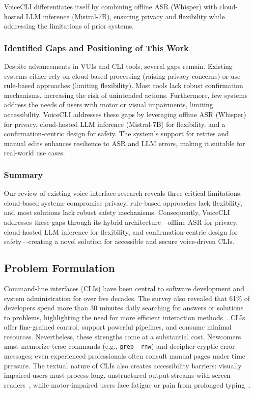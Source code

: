 \documentclass[a4paper,12pt]{article}
\begin{document}
VoiceCLI differentiates itself by combining offline ASR (Whisper) with cloud-hosted LLM inference (Mistral-7B), ensuring privacy and flexibility while addressing the limitations of prior systems.

\subsubsection{Identified Gaps and Positioning of This Work}
Despite advancements in VUIs and CLI tools, several gaps remain. Existing systems either rely on cloud-based processing (raising privacy concerns) or use rule-based approaches (limiting flexibility). Most tools lack robust confirmation mechanisms, increasing the risk of unintended actions. Furthermore, few systems address the needs of users with motor or visual impairments, limiting accessibility. VoiceCLI addresses these gaps by leveraging offline ASR (Whisper) for privacy, cloud-hosted LLM inference (Mistral-7B) for flexibility, and a confirmation-centric design for safety. The system's support for retries and manual edits enhances resilience to ASR and LLM errors, making it suitable for real-world use cases.

\subsubsection{Summary}
Our review of existing voice interface research reveals three critical limitations: cloud-based systems compromise privacy, rule-based approaches lack flexibility, and most solutions lack robust safety mechanisms. Consequently, VoiceCLI addresses these gaps through its hybrid architecture—offline ASR for privacy, cloud-hosted LLM inference for flexibility, and confirmation-centric design for safety—creating a novel solution for accessible and secure voice-driven CLIs.


\subsection{Problem Formulation}

Command-line interfaces (CLIs) have been central to software development and system administration for over five decades. The survey also revealed that 61\% of developers spend more than 30 minutes daily searching for answers or solutions to problems, highlighting the need for more efficient interaction methods~\cite{ref2}. CLIs offer fine-grained control, support powerful pipelines, and consume minimal resources. Nevertheless, these strengths come at a substantial cost. Newcomers must memorize terse commands (e.g., \texttt{grep -rnw}) and decipher cryptic error messages; even experienced professionals often consult manual pages under time pressure. The textual nature of CLIs also creates accessibility barriers: visually impaired users must process long, unstructured output streams with screen readers~\cite{ref3}, while motor-impaired users face fatigue or pain from prolonged typing~\cite{ref4}.
\end{document}
